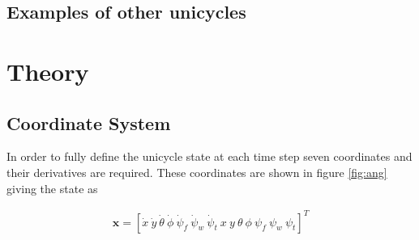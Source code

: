 \documentclass[twoside,twocolumn,12pt]{article}
\begin{document}
\subsection{Examples of other unicycles}



\clearpage
\section{Theory}
\subsection{Coordinate System}
In order to fully define the unicycle state at each time step seven coordinates and their derivatives are required. These coordinates are shown in figure \ref{fig:ang} giving the state as

\begin{align*}
\textbf{x} = [\dot{x} \: \dot{y}\: \dot{\theta}\: \dot{\phi}\: \dot{\psi}_f\: \dot{\psi}_w \:\dot{\psi}_t \: x \: y \: \theta \: \phi \: \psi_f \: \psi_w \: \psi_t]^T
\end{align*}
\end{document}
